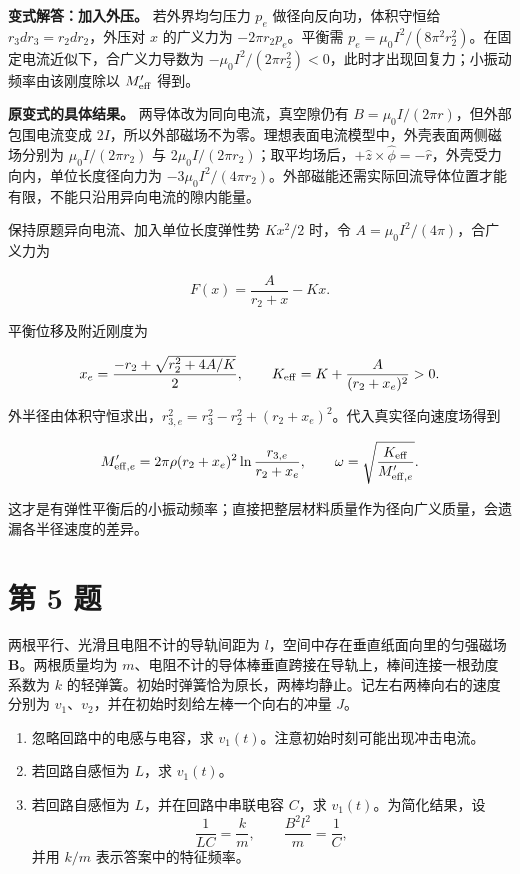 \documentclass[12pt,a4paper,UTF8]{ctexart}
\newcommand{\tightlist}{\setlength{\itemsep}{0pt}\setlength{\parskip}{0pt}}
\begin{document}
\textbf{变式解答：加入外压。} 若外界均匀压力 \(p_e\)
做径向反向功，体积守恒给 \(r_3dr_3=r_2dr_2\)，外压对 \(x\) 的广义力为
\(-2\pi r_2p_e\)。平衡需
\(p_e=\mu_0I^2/(8\pi^2r_2^2)\)。在固定电流近似下，合广义力导数为
\(-\mu_0I^2/(2\pi r_2^2)<0\)，此时才出现回复力；小振动频率由该刚度除以
\(M_{\rm eff}'\) 得到。

\textbf{原变式的具体结果。} 两导体改为同向电流，真空隙仍有
\(B=\mu_0I/(2\pi r)\)，但外部包围电流变成
\(2I\)，所以外部磁场不为零。理想表面电流模型中，外壳表面两侧磁场分别为
\(\mu_0I/(2\pi r_2)\) 与
\(2\mu_0I/(2\pi r_2)\)；取平均场后，\(+\hat z\times\hat\phi=-\hat r\)，外壳受力向内，单位长度径向力为
\(-3\mu_0I^2/(4\pi r_2)\)。外部磁能还需实际回流导体位置才能有限，不能只沿用异向电流的隙内能量。

保持原题异向电流、加入单位长度弹性势 \(Kx^2/2\) 时，令
\(A=\mu_0I^2/(4\pi)\)，合广义力为

\[F(x)=\frac{A}{r_2+x}-Kx.\]

平衡位移及附近刚度为

\[x_e=\frac{-r_2+\sqrt{r_2^2+4A/K}}2,\qquad K_{\rm eff}=K+\frac{A}{(r_2+x_e)^2}>0.\]

外半径由体积守恒求出，\(r_{3,e}^2=r_3^2-r_2^2+(r_2+x_e)^2\)。代入真实径向速度场得到

\[M_{{\rm eff},e}'=2\pi\rho(r_2+x_e)^2\ln\frac{r_{3,e}}{r_2+x_e},\qquad\omega=\sqrt{\frac{K_{\rm eff}}{M_{{\rm eff},e}'}}.\]

这才是有弹性平衡后的小振动频率；直接把整层材料质量作为径向广义质量，会遗漏各半径速度的差异。

\newpage

\section{第 5 题}\label{ux7b2c-5-ux9898}

两根平行、光滑且电阻不计的导轨间距为
\(l\)，空间中存在垂直纸面向里的匀强磁场 \(\bm B\)。两根质量均为
\(m\)、电阻不计的导体棒垂直跨接在导轨上，棒间连接一根劲度系数为 \(k\)
的轻弹簧。初始时弹簧恰为原长，两棒均静止。记左右两棒向右的速度分别为
\(v_1\)、\(v_2\)，并在初始时刻给左棒一个向右的冲量 \(J\)。

\begin{enumerate}
\def\labelenumi{\arabic{enumi}.}
\tightlist
\item
  忽略回路中的电感与电容，求 \(v_1(t)\)。注意初始时刻可能出现冲击电流。
\item
  若回路自感恒为 \(L\)，求 \(v_1(t)\)。
\item
  若回路自感恒为 \(L\)，并在回路中串联电容 \(C\)，求
  \(v_1(t)\)。为简化结果，设
  \[\frac1{LC}=\frac{k}{m},\qquad \frac{B^2l^2}{m}=\frac1C,\] 并用
  \(k/m\) 表示答案中的特征频率。
\end{enumerate}
\end{document}
